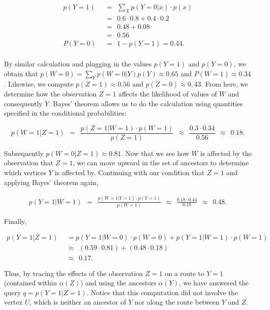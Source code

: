 \begin{example}
\begin{align*}
	p(Y = 1) 	& \ \ = \ \ \sum_{X} p(Y = 0|x) \cdot p(x) \\ 
			& \ \ = \ \ 0.6 \cdot 0.8 + 0.4 \cdot 0.2 \\
			& \ \ = \ \ 0.48 + 0.08 \\
			& \ \ = \ \ 0.56 \\
	P(Y = 0)        & \ \ = \ \  1 - p(Y=1) = 0.44. \\
\end{align*}

By similar calculation and plugging in the values $p(Y=1)$ and $p(Y=0)$, we obtain that $p(W = 0) = \sum_{Y} p(W=0|Y)p(Y) \approx 0.65$ and $P(W = 1) \approx 0.34$. Likewise, we compute $p( Z = 1) \approx 0.56$ and $p(Z = 0) \approx 0,43$. \newline
\null \quad \quad From here, we determine how the observation $Z=1$ affects the likelihood of values of $W$ and consequently $Y$. Bayes' theorem allows us to do the calculation using quantities specified in the conditional probabilities:

$$p(W=1 | Z = 1) \ \ = \ \ \frac{p(Z=1|W=1)\cdot p(W=1)}{p(Z=1)} \ \ \approx \ \ \frac{0.3 \cdot 0.34}{0.56} \ \ \approx \ \ 0.18.$$

Subsequently $p(W = 0 | Z = 1) \approx 0.81$. Now that we see how $W$ is affected by the observation that $Z = 1$, we can move upward in the set of ancestors to determine which vertices $Y$ is affected by. Continuing with our condition that $Z=1$ and applying Bayes' theorem again,

\begin{align*}
	p(Y = 1 | W = 1)  \ \ = \ \ \frac{ p(W = 1 | Y = 1) \cdot p(Y = 1) }{p(W=1)} \ \ \approx \ \ \frac{0.18 \cdot 0.44}{0.18} \ \ \approx \ \ 0.48.
\end{align*}

Finally,

\begin{align*}
	p(Y = 1 | Z = 1) 	& \ \ = p(Y = 1|W = 0)\cdot p(W = 0) + p(Y=1|W=1)\cdot p(W=1) \\ 
			& \ \ \approx \ \ (0.59 \cdot 0.81)+(0.48 \cdot 0.18) \\
			& \ \ \approx \ \ 0.17.
\end{align*}

Thus, by tracing the effects of the observation $Z=1$ on a route to $Y=1$ (contained within $\alpha(Z)$) and using the ancestors $\alpha(Y)$, we have answered the query $q = p(Y = 1|Z = 1)$. Notice that this computation did not involve the vertex $U$, which is neither an ancestor of $Y$ nor along the route between $Y$ and $Z$. 
\end{example}

